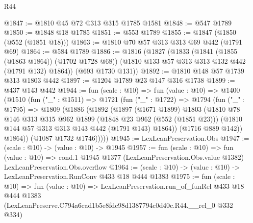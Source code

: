 \begin{lexlean}{R44}
\begin{coremodule}
@1847 := @1810 @45 @72 @313 @315 @1785 @1581
@1848 := @547 @1789
@1850 := @1848 @18 @1785
@1851 := @553 @1789
@1855 := @1847 (@1850 (@552 (@1851 @18)))
@1863 := @1810 @70 @57 @313 @313 @69 @442 (@1791 @69)
@1864 := @584 @1789
@1886 := @1816
    (@1827
      (@1833
        (@1841 (@1855 (@1863 @1864)) (@1702 @1728 @68))
        (@1810 @133 @57 @313 @313 @132 @442 (@1791 @132) @1864))
      (@693 @1730 @131))
@1892 := @1810 @148 @57 @1739 @313 @1803 @442
@1897 := @1204 @1789 @23 @147 @316 @1738
@1899 := @437 @143 @442
@1944 := fun (scale : @10) =>
  fun (value : @10) =>
  @1400
    (@1510
      (fun ("_" : @1511) =>
      @1721
        (fun ("_" : @1722) =>
        @1794
          (fun ("_" : @1795) =>
          @1809
            (@1886
              (@1892
                (@1897
                  (@1671 @1899)
                  @1803
                  (@1810
                    @78
                    @146
                    @313
                    @315
                    @962
                    @1899
                    (@1848 @23 @962 (@552 (@1851 @23)))
                    (@1810 @144 @57 @313 @313 @143 @442 (@1791 @143) @1864))
                  (@1716 @889 @142))
                @1864))
            (@1087 @1732 @1746)))))
@1945 := LexLeanPreservation.Obs
@1947 := (scale : @10) -> (value : @10) -> @1945
@1957 := fun (scale : @10) =>
  fun (value : @10) =>
  cond.{1} @1945 @1377 (LexLeanPreservation.Obs.value @1382) LexLeanPreservation.Obs.overflow
@1964 := (scale : @10) -> (value : @10) -> LexLeanPreservation.RunConv @433 @18 @444 @1383
@1975 := fun (scale : @10) =>
  fun (value : @10) =>
  LexLeanPreservation.run_of_funRel
    @433
    @18
    @444
    @1383
    (LexLeanPreserve.C794a6cad1b5e8fdc98d1387794c0d40c.R44.__rel_0 @332 @334)
\end{coremodule}
\end{lexlean}
